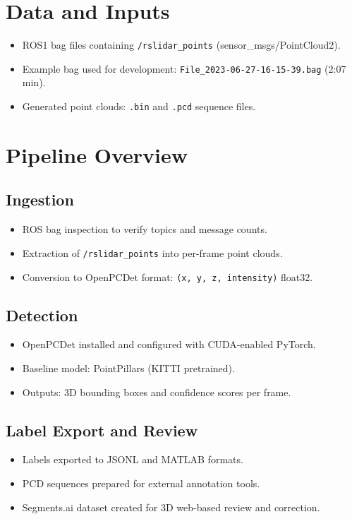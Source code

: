 \documentclass[11pt,a4paper]{report}
\begin{document}
\chapter{Data and Inputs}
\begin{itemize}[leftmargin=2em]
    \item ROS1 bag files containing \texttt{/rslidar\_points} (sensor\_msgs/PointCloud2).
    \item Example bag used for development: \texttt{File\_2023-06-27-16-15-39.bag} (2:07 min).
    \item Generated point clouds: \texttt{.bin} and \texttt{.pcd} sequence files.
\end{itemize}

\chapter{Pipeline Overview}
\section*{Ingestion}
\begin{itemize}[leftmargin=2em]
    \item ROS bag inspection to verify topics and message counts.
    \item Extraction of \texttt{/rslidar\_points} into per-frame point clouds.
    \item Conversion to OpenPCDet format: \texttt{(x, y, z, intensity)} float32.
\end{itemize}

\section*{Detection}
\begin{itemize}[leftmargin=2em]
    \item OpenPCDet installed and configured with CUDA-enabled PyTorch.
    \item Baseline model: PointPillars (KITTI pretrained).
    \item Outputs: 3D bounding boxes and confidence scores per frame.
\end{itemize}

\section*{Label Export and Review}
\begin{itemize}[leftmargin=2em]
    \item Labels exported to JSONL and MATLAB formats.
    \item PCD sequences prepared for external annotation tools.
    \item Segments.ai dataset created for 3D web-based review and correction.
\end{itemize}
\end{document}
